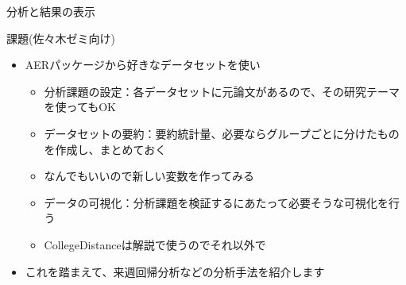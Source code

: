 \documentclass[
  ignorenonframetext,
]{beamer}
\providecommand{\tightlist}{%
  \setlength{\itemsep}{0pt}\setlength{\parskip}{0pt}}
\begin{document}
\begin{frame}[fragile]{分析と結果の表示}
\begin{block}{課題(佐々木ゼミ向け)}
\protect\hypertarget{ux8ab2ux984cux4f50ux3005ux6728ux30bcux30dfux5411ux3051}{}
\begin{itemize}
\tightlist
\item
  AERパッケージから好きなデータセットを使い

  \begin{itemize}
  \tightlist
  \item
    分析課題の設定：各データセットに元論文があるので、その研究テーマを使ってもOK
  \item
    データセットの要約：要約統計量、必要ならグループごとに分けたものを作成し、まとめておく
  \item
    なんでもいいので新しい変数を作ってみる
  \item
    データの可視化：分析課題を検証するにあたって必要そうな可視化を行う
  \item
    CollegeDistanceは解説で使うのでそれ以外で
  \end{itemize}
\item
  これを踏まえて、来週回帰分析などの分析手法を紹介します
\end{itemize}
\end{block}
\end{frame}
\end{document}
